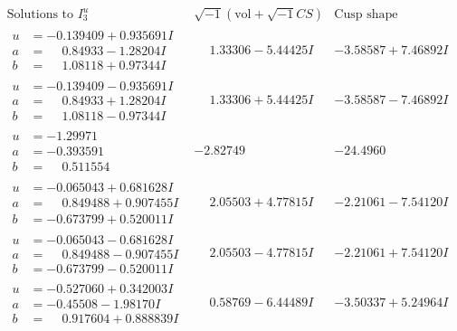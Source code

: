 \documentclass[1p]{elsarticle_modified}
\theoremstyle{definition}
\newcommand{\I}{\sqrt{-1}}
\begin{document}
$$\begin{array}{c|c|c}  
\text{Solutions to }I^u_{3}& \I (\text{vol} + \sqrt{-1}CS) & \text{Cusp shape}\\
 \hline 
\begin{aligned}
u &= -0.139409 + 0.935691 I \\
a &= \phantom{-}0.84933 - 1.28204 I \\
b &= \phantom{-}1.08118 + 0.97344 I\end{aligned}
 & \phantom{-}1.33306 - 5.44425 I & -3.58587 + 7.46892 I \\ \hline\begin{aligned}
u &= -0.139409 - 0.935691 I \\
a &= \phantom{-}0.84933 + 1.28204 I \\
b &= \phantom{-}1.08118 - 0.97344 I\end{aligned}
 & \phantom{-}1.33306 + 5.44425 I & -3.58587 - 7.46892 I \\ \hline\begin{aligned}
u &= -1.29971\phantom{ +0.000000I} \\
a &= -0.393591\phantom{ +0.000000I} \\
b &= \phantom{-}0.511554\phantom{ +0.000000I}\end{aligned}
 & -2.82749\phantom{ +0.000000I} & -24.4960\phantom{ +0.000000I} \\ \hline\begin{aligned}
u &= -0.065043 + 0.681628 I \\
a &= \phantom{-}0.849488 + 0.907455 I \\
b &= -0.673799 + 0.520011 I\end{aligned}
 & \phantom{-}2.05503 + 4.77815 I & -2.21061 - 7.54120 I \\ \hline\begin{aligned}
u &= -0.065043 - 0.681628 I \\
a &= \phantom{-}0.849488 - 0.907455 I \\
b &= -0.673799 - 0.520011 I\end{aligned}
 & \phantom{-}2.05503 - 4.77815 I & -2.21061 + 7.54120 I \\ \hline\begin{aligned}
u &= -0.527060 + 0.342003 I \\
a &= -0.45508 - 1.98170 I \\
b &= \phantom{-}0.917604 + 0.888839 I\end{aligned}
 & \phantom{-}0.58769 - 6.44489 I & -3.50337 + 5.24964 I \\ \hline\begin{aligned}

\end{aligned}
\end{array}$$
\end{document}
